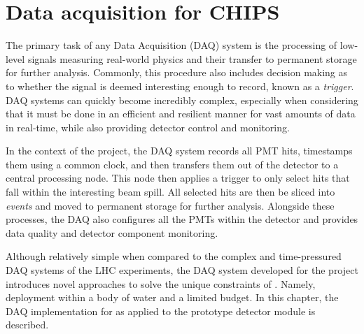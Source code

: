 \chapter{Data acquisition for CHIPS} %
\label{chap:daq} %

The primary task of any Data Acquisition (DAQ) system is the processing of low-level signals
measuring real-world physics and their transfer to permanent storage for further analysis.
Commonly, this procedure also includes decision making as to whether the signal is deemed
interesting enough to record, known as a \emph{trigger}. DAQ systems can quickly become incredibly
complex, especially when considering that it must be done in an efficient and resilient manner for
vast amounts of data in real-time, while also providing detector control and monitoring.

In the context of the \chips project, the DAQ system records all PMT hits, timestamps them using a
common clock, and then transfers them out of the detector to a central processing node. This node
then applies a trigger to only select hits that fall within the interesting beam spill. All
selected hits are then be sliced into \emph{events} and moved to permanent storage for further
analysis. Alongside these processes, the DAQ also configures all the PMTs within the detector and
provides data quality and detector component monitoring.

Although relatively simple when compared to the complex and time-pressured DAQ systems of the LHC
experiments, the DAQ system developed for the \chips project introduces novel approaches to solve
the unique constraints of \chips. Namely, deployment within a body of water and a limited budget.
In this chapter, the DAQ implementation for \chips as applied to the \chipsfive prototype detector
module is described.

